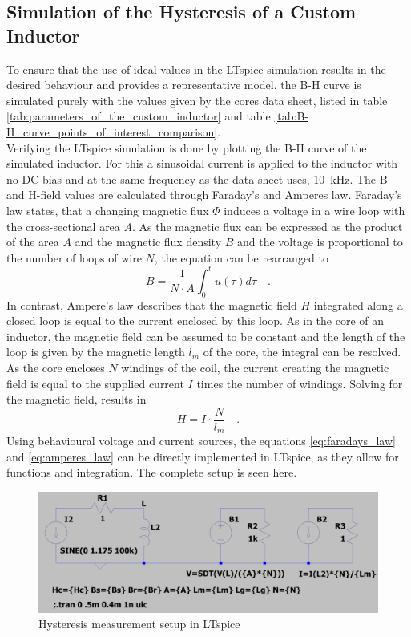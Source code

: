 \subsection{Simulation of the Hysteresis of a Custom Inductor}
To ensure that the use of ideal values in the LTspice simulation results in the desired behaviour and provides a representative model, the B-H curve is simulated purely with the values given by the cores data sheet, listed in table \ref{tab:parameters_of_the_custom_inductor} and table \ref{tab:B-H_curve_points_of_interest_comparison}. \\
Verifying the LTspice simulation is done by plotting the B-H curve of the simulated inductor. For this a sinusoidal current is applied to the inductor with no \ac{DC} bias and at the same frequency as the data sheet uses, \SI{10}{\kilo\Hz}. The B- and H-field values are calculated through Faraday's and Amperes law. Faraday's law states, that a changing magnetic flux $\Phi$ induces a voltage in a wire loop with the cross-sectional area $A$. As the magnetic flux can be expressed as the product of the area $A$ and the magnetic flux density $B$ and the voltage is proportional to the number of loops of wire $N$, the equation can be rearranged to 
\begin{equation}\label{eq:faradays_law}
	B = \frac{1}{N \cdot A} \int_0^t u(\tau)d\tau \quad\text{.}   
\end{equation}
In contrast, Ampere's law describes that the magnetic field $H$ integrated along a closed loop is equal to the current enclosed by this loop. As in the core of an inductor, the magnetic field can be assumed to be constant and the length of the loop is given by the magnetic length $l_m$ of the core, the integral can be resolved. As the core encloses $N$ windings of the coil, the current creating the magnetic field is equal to the supplied current $I$ times the number of windings. Solving for the magnetic field, results in 
\begin{equation}\label{eq:amperes_law}
	H = I \cdot \frac{N}{l_m} \quad\text{.}
\end{equation}
Using behavioural voltage and current sources, the equations \ref{eq:faradays_law} and \ref{eq:amperes_law} can be directly implemented in LTspice, as they allow for functions and integration. The complete setup is seen here. 
\begin{figure}[H]
    \centering
    \includegraphics[width=.9\linewidth]{Bilder//Kapitel3/Hysteresis_Measurement_Setup_LTspice.png}
    \caption{Hysteresis measurement setup in LTspice}
    \label{fig:hysteresis_measurement_setup_in_LTspice}
\end{figure}
